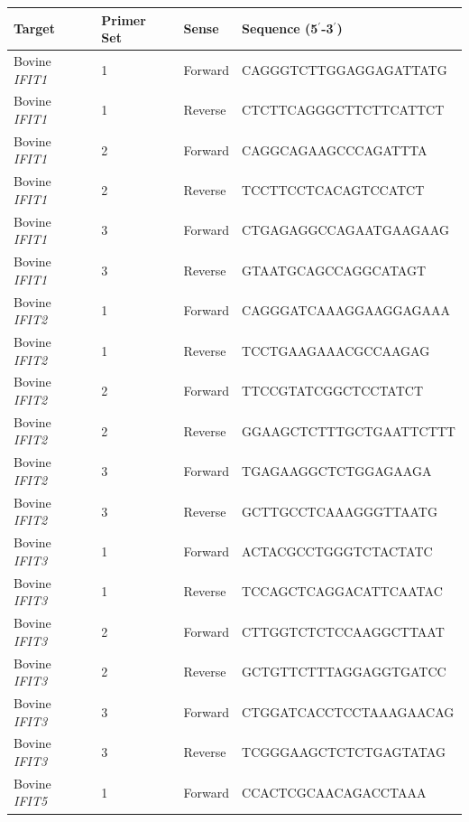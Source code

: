 \begin{table}
\centering
\begin{tabular}{lllll}
\toprule
\textbf{Target} & \textbf{Primer   Set} & \multicolumn{2}{l}{\textbf{Sense}} & \textbf{Sequence   (5$^{\prime}$-3$^{\prime}$)} \\ \midrule
Bovine \textit{IFIT1} & 1 & Forward & \multicolumn{2}{l}{CAGGGTCTTGGAGGAGATTATG}  \\ 
Bovine \textit{IFIT1} & 1 & Reverse & \multicolumn{2}{l}{CTCTTCAGGGCTTCTTCATTCT}  \\ 
Bovine \textit{IFIT1} & 2 & Forward & \multicolumn{2}{l}{CAGGCAGAAGCCCAGATTTA}    \\ 
Bovine \textit{IFIT1} & 2 & Reverse & \multicolumn{2}{l}{TCCTTCCTCACAGTCCATCT}    \\ 
Bovine \textit{IFIT1} & 3 & Forward & \multicolumn{2}{l}{CTGAGAGGCCAGAATGAAGAAG}  \\ 
Bovine \textit{IFIT1} & 3 & Reverse & \multicolumn{2}{l}{GTAATGCAGCCAGGCATAGT}    \\ 
Bovine \textit{IFIT2} & 1 & Forward & \multicolumn{2}{l}{CAGGGATCAAAGGAAGGAGAAA}  \\ 
Bovine \textit{IFIT2} & 1 & Reverse & \multicolumn{2}{l}{TCCTGAAGAAACGCCAAGAG}    \\ 
Bovine \textit{IFIT2} & 2 & Forward & \multicolumn{2}{l}{TTCCGTATCGGCTCCTATCT}    \\ 
Bovine \textit{IFIT2} & 2 & Reverse & \multicolumn{2}{l}{GGAAGCTCTTTGCTGAATTCTTT} \\ 
Bovine \textit{IFIT2} & 3 & Forward & \multicolumn{2}{l}{TGAGAAGGCTCTGGAGAAGA}    \\ 
Bovine \textit{IFIT2} & 3 & Reverse & \multicolumn{2}{l}{GCTTGCCTCAAAGGGTTAATG}   \\ 
Bovine \textit{IFIT3} & 1 & Forward & \multicolumn{2}{l}{ACTACGCCTGGGTCTACTATC}   \\
Bovine \textit{IFIT3} & 1 & Reverse & \multicolumn{2}{l}{TCCAGCTCAGGACATTCAATAC}  \\ 
Bovine \textit{IFIT3} & 2 & Forward & \multicolumn{2}{l}{CTTGGTCTCTCCAAGGCTTAAT}  \\ 
Bovine \textit{IFIT3} & 2 & Reverse & \multicolumn{2}{l}{GCTGTTCTTTAGGAGGTGATCC}  \\ 
Bovine \textit{IFIT3} & 3 & Forward & \multicolumn{2}{l}{CTGGATCACCTCCTAAAGAACAG} \\ 
Bovine \textit{IFIT3} & 3 & Reverse & \multicolumn{2}{l}{TCGGGAAGCTCTCTGAGTATAG}  \\ 
Bovine \textit{IFIT5} & 1 & Forward & \multicolumn{2}{l}{CCACTCGCAACAGACCTAAA}    \\ 

\end{tabular}
\end{table}
